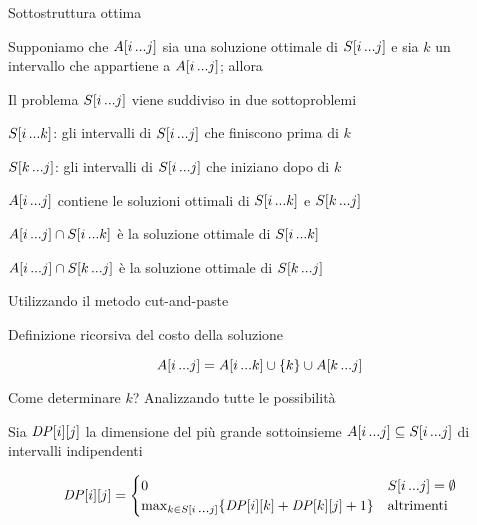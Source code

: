 \begin{frame}{Sottostruttura ottima}

\vspace{-9pt}
\begin{myboxtitle}[Teorema]
Supponiamo che $A[i \mydots j]$ sia una soluzione ottimale di $S[i \mydots j]$ e sia $k$
un intervallo che appartiene a $A[i \mydots j]$; allora

\BIL
\item \alert{Il problema $S[i \mydots j]$ viene suddiviso in due sottoproblemi}
	\BI
	\item $S[i \mydots k]$:  gli intervalli di $S[i \mydots j]$ che finiscono prima di $k$
	\item $S[k \mydots j]$:  gli intervalli di $S[i \mydots j]$ che iniziano dopo di $k$
	\EI
\item \alert{$A[i \mydots j]$ contiene le soluzioni ottimali di $S[i \mydots k]$ e $S[k \mydots j]$}
	\BI
	\item $A[i \mydots j] \cap S[i \mydots k]$ è la soluzione ottimale di $S[i \mydots k]$
	\item $A[i \mydots j] \cap S[k \mydots j]$ è la soluzione ottimale di $S[k \mydots j]$
	\EI
\EIL
\end{myboxtitle}

\begin{myboxtitle}[Dimostrazione]
Utilizzando il metodo cut-and-paste
\end{myboxtitle}
\end{frame}

\begin{frame}{Definizione ricorsiva del costo della soluzione}

\vspace{-9pt}
\begin{myboxtitle}
\[
	A[i \mydots j] = A[i \mydots k] \cup \{ k \} \cup A[k \mydots j]
\]
\end{myboxtitle}

\begin{myboxtitle}
\BIL
\item Come determinare $k$? Analizzando tutte le possibilità
\item Sia $\DP[i][j]$ la dimensione del
più grande sottoinsieme $A[i \mydots j] \subseteq S[i \mydots j]$ di intervalli indipendenti

\small
\[
\DP[i][j] = \begin{cases}
   0 & S[i \mydots j] = \emptyset \\
	 \max_{k \in S[i \mydots j]} \{ \DP[i][k] + \DP[k][j] + 1 \} & \textrm{altrimenti}
\end{cases}
\]
\EIL
\end{myboxtitle}
\end{frame}

